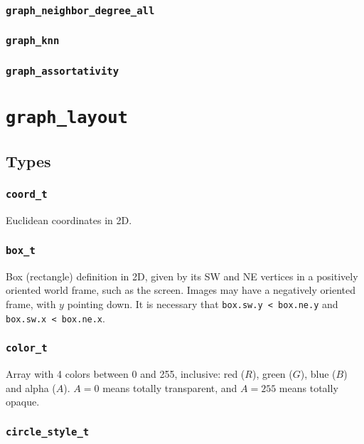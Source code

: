 \documentclass[a4paper,10pt]{article}
\begin{document}
\subsubsection{\texttt{graph\_neighbor\_degree\_all}}
\subsubsection{\texttt{graph\_knn}}
\subsubsection{\texttt{graph\_assortativity}}

\section{\texttt{graph\_layout}}

\subsection{Types}

\subsubsection{\texttt{coord\_t}}

Euclidean coordinates in 2D.

\subsubsection{\texttt{box\_t}}

Box (rectangle) definition in 2D, given by its SW and NE vertices in a 
positively oriented world frame, such as the screen. Images may have
a negatively oriented frame, with $y$ pointing down.
It is necessary that \texttt{box.sw.y < box.ne.y} and \texttt{box.sw.x < box.ne.x}.

\subsubsection{\texttt{color\_t}}

Array with 4 colors between 0 and 255, inclusive: red ($R$), green ($G$), blue ($B$) and 
alpha ($A$). $A=0$ means totally transparent, and $A = 255$ means totally opaque.

\subsubsection{\texttt{circle\_style\_t}}
\end{document}
